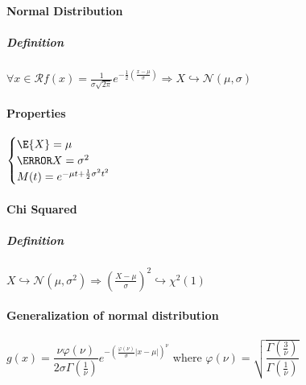 \paragraph{Normal Distribution}
\subparagraph{Definition}
\begin{center}
$\forall x\in\mathcal{R} f(x)=\frac{1}{\sigma\sqrt{2\pi}}e^{-\frac{1}{2}\left(\frac{x-\mu}{\sigma}\right)}\Rightarrow X\hookrightarrow\mathcal{N}(\mu,\sigma)$ 
\end{center}
\paragraph{Properties}
\begin{center}
	$\begin{cases}\E{X}=\mu\\\V{X}=\sigma^{2}\\M(t)=e^{-\mu t+\frac{1}{2}\sigma^{2}t^{2}}\end{cases}$
\end{center}
\paragraph{Chi Squared}
\subparagraph{Definition}
\begin{center}
	$X\hookrightarrow\mathcal{N}(\mu,\sigma^{2})\Rightarrow\left( \frac{X-\mu}{\sigma} \right)^{2}\hookrightarrow\chi^{2}(1)$
\end{center}

\paragraph{Generalization of normal distribution}
\begin{center}
$g(x)=\dfrac{\nu\varphi(\nu)}{2\sigma\Gamma(\frac{1}{\nu})}e^{-\left( \frac{\varphi(\nu)}{\sigma}|x-\mu| \right)^{\nu}}$ where $\varphi(\nu)=\sqrt{\dfrac{\Gamma\left(\frac{3}{\nu}\right)}{\Gamma(\frac{1}{\nu})}}$
\end{center}
